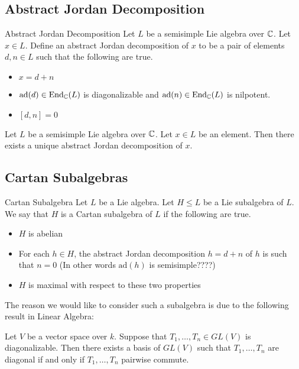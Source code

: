 \documentclass[a4paper]{article}
\begin{document}
\subsection{Abstract Jordan Decomposition}
\begin{defn}{Abstract Jordan Decomposition}{} Let $L$ be a semisimple Lie algebra over $\mathbb{C}$. Let $x\in L$. Define an abstract Jordan decomposition of $x$ to be a pair of elements $d,n\in L$ such that the following are true. 
\begin{itemize}
\item $x=d+n$
\item $\text{ad}(d)\in\text{End}_{\mathbb{C}}(L)$ is diagonalizable and $\text{ad}(n)\in\text{End}_{\mathbb{C}}(L)$ is nilpotent. 
\item $[d,n]=0$
\end{itemize}
\end{defn}

\begin{crl}{}{} Let $L$ be a semisimple Lie algebra over $\mathbb{C}$. Let $x\in L$ be an element. Then there exists a unique abstract Jordan decomposition of $x$. 
\end{crl}

\subsection{Cartan Subalgebras}
\begin{defn}{Cartan Subalgebra}{} Let $L$ be a Lie algebra. Let $H\leq L$ be a Lie subalgebra of $L$. We say that $H$ is a Cartan subalgebra of $L$ if the following are true. 
\begin{itemize}
\item $H$ is abelian
\item For each $h\in H$, the abstract Jordan decomposition $h=d+n$ of $h$ is such that $n=0$ (In other words $\text{ad}(h)$ is semisimple????)
\item $H$ is maximal with respect to these two properties
\end{itemize}
\end{defn}

The reason we would like to consider such a subalgebra is due to the following result in Linear Algebra: 

\begin{lmm}{}{} Let $V$ be a vector space over $k$. Suppose that $T_1,\dots,T_n\in GL(V)$ is diagonalizable. Then there exists a basis of $GL(V)$ such that $T_1,\dots,T_n$ are diagonal if and only if $T_1,\dots,T_n$ pairwise commute. 
\end{lmm}
\end{document}
